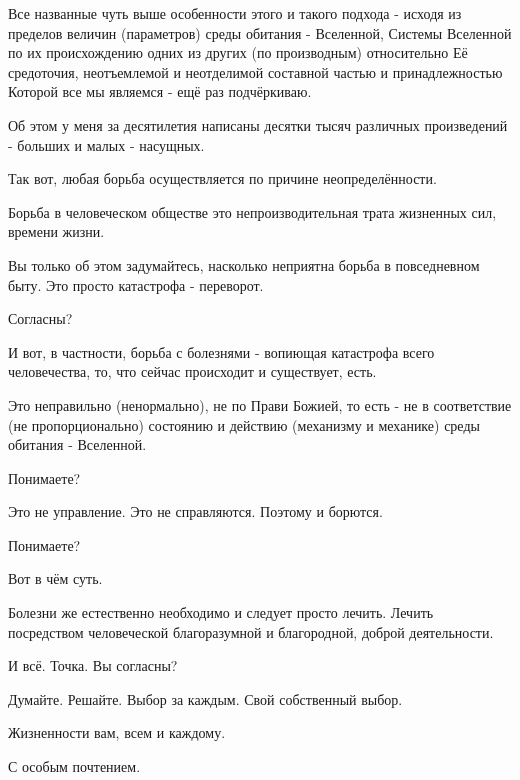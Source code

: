 \begin{multicols}{2}
Все названные чуть выше особенности этого и такого подхода - исходя из пределов
величин (параметров) среды обитания - Вселенной, Системы Вселенной по их
происхождению одних из других (по производным) относительно Её средоточия,
неотъемлемой и неотделимой составной частью и принадлежностью Которой все мы
являемся - ещё раз подчёркиваю.

Об этом у меня за десятилетия написаны десятки тысяч различных произведений -
больших и малых - насущных.

Так вот, любая борьба осуществляется по причине неопределённости.

Борьба в человеческом обществе это непроизводительная трата жизненных сил,
времени жизни.

Вы только об этом задумайтесь, насколько неприятна борьба в повседневном быту.
Это просто катастрофа - переворот.

Согласны?

И вот, в частности, борьба с болезнями - вопиющая катастрофа всего
человечества, то, что сейчас происходит и существует, есть.

Это неправильно (ненормально), не по Прави Божией, то есть - не в соответствие
(не пропорционально) состоянию и действию (механизму и механике) среды обитания
- Вселенной.

Понимаете?

Это не управление. Это не справляются. Поэтому и борются.

Понимаете?

Вот в чём суть.

Болезни же естественно необходимо и следует просто лечить. Лечить посредством
человеческой благоразумной и благородной, доброй деятельности.

И всё. Точка. Вы согласны?

Думайте. Решайте. Выбор за каждым. Свой собственный выбор.

Жизненности вам, всем и каждому.

С особым почтением.
\end{multicols}
